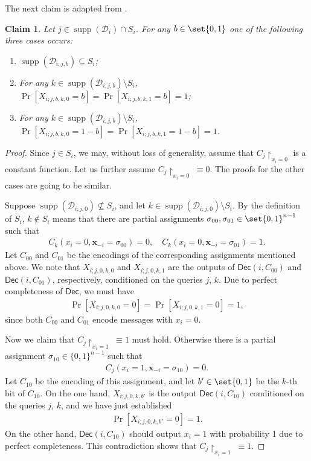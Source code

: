 \documentclass[10pt,a4paper]{article}
\newtheorem{claim}{Claim}
\theoremstyle{remark}
\newcommand{\zo}{\ensuremath{{\{0,1\}}}\xspace}
\def\*#1{\mathbf{#1}}
\def\+#1{\mathcal{#1}}
\newcommand{\Dec}{\ensuremath{\mathsf{Dec}}\xspace}
\providecommand{\supp}{\operatorname{supp}}
\begin{document}
The next claim is adapted from .
\begin{claim} \label{clm:adaptive-fixable-or-useless}
Let $j \in \supp(\+D_i)\cap S_i$. For any $b \in \set{0,1}$ one of the following three cases occurs:
\begin{enumerate}
\item $\supp(\+D_{i;j,b}) \subseteq S_i$; 
\item For any $k \in \supp(\+D_{i;j,b}) \setminus S_i$, $\Pr[X_{i;j,b,k,0} = b] = \Pr[X_{i;j,b,k,1} = b] = 1$; 
\item For any $k \in \supp(\+D_{i;j,b}) \setminus S_i$, $\Pr[X_{i;j,b,k,0} = 1-b] = \Pr[X_{i;j,b,k,1} = 1-b] = 1$.
\end{enumerate}
\end{claim}
\begin{proof}
Since $j \in S_i$, we may, without loss of generality, assume that $C_j \restriction_{x_i=0}$ is a constant function. Let us further assume $C_j \restriction_{x_i=0} \;\equiv 0$. The proofs for the other cases are going to be similar.

Suppose $\supp(\+D_{i;j,0}) \not\subseteq S_i$, and let $k \in \supp(\+D_{i;j,0}) \setminus S_i$. By the definition of $S_i$, $k \notin S_i$ means that there are partial assignments $\sigma_{00}, \sigma_{01} \in \set{0,1}^{n-1}$ such that
\begin{align*}
C_k(x_i=0, \*x_{-i}=\sigma_{00}) = 0, \quad C_k(x_i=0, \*x_{-i}=\sigma_{01}) = 1.
\end{align*}
Let $C_{00}$ and $C_{01}$ be the encodings of the corresponding assignments mentioned above. We note that $X_{i;j,0,k,0}$ and $X_{i;j,0,k,1}$ are the outputs of $\Dec(i,C_{00})$ and $\Dec(i,C_{01})$, respectively, conditioned on the queries $j$, $k$. Due to perfect completeness of $\Dec$, we must have 
\begin{align*}
	\Pr[X_{i;j,0,k,0} = 0] = \Pr[X_{i;j,0,k,1} = 0] = 1,
\end{align*}
since both $C_{00}$ and $C_{01}$ encode messages with $x_i = 0$.

Now we claim that $C_j\restriction_{x_i=1} \;\equiv 1$ must hold. Otherwise there is a partial assignment $\sigma_{10} \in \zo^{n-1}$ such that
\begin{align*}
C_j(x_i=1, \*x_{-i}=\sigma_{10}) = 0.
\end{align*}
Let $C_{10}$ be the encoding of this assignment, and let $b' \in \set{0,1}$ be the $k$-th bit of $C_{10}$. On the one hand, $X_{i;j,0,k,b'}$ is the output $\Dec(i,C_{10})$ conditioned on the queries $j$, $k$, and we have just established
\begin{align*}
	\Pr[X_{i;j,0,k,b'} = 0] = 1.
\end{align*} 
On the other hand, $\Dec(i,C_{10})$ should output $x_i=1$ with probability 1 due to perfect completeness. This contradiction shows that $C_j\restriction_{x_i=1} \;\equiv 1$. 


\end{proof}
\end{document}
